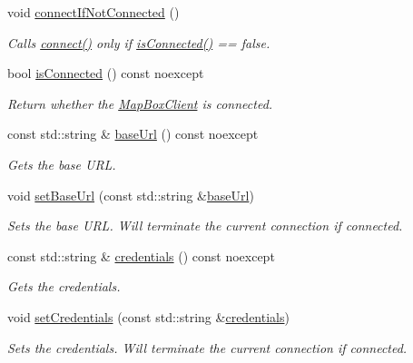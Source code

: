 \begin{DoxyCompactItemize}
void \hyperlink{group___imagery_module_gafbcd14e6930fee4427877f52e36613ba}{connect\+If\+Not\+Connected} ()
\begin{DoxyCompactList}\small\item\em Calls \hyperlink{group___imagery_module_ga5e5f58c725cafba7966936f688a6ade0}{connect()} only if \hyperlink{group___imagery_module_gab0c42dc6fd8965108c0bc5ef80d4d4b3}{is\+Connected()} == false. \end{DoxyCompactList}\item 
bool \hyperlink{group___imagery_module_gab0c42dc6fd8965108c0bc5ef80d4d4b3}{is\+Connected} () const noexcept
\begin{DoxyCompactList}\small\item\em Return whether the \hyperlink{classdg_1_1deepcore_1_1imagery_1_1_map_box_client}{Map\+Box\+Client} is connected. \end{DoxyCompactList}\item 
const std\+::string \& \hyperlink{group___imagery_module_gadf279770cec6dc9ac56348bb2e1b29e1}{base\+Url} () const noexcept
\begin{DoxyCompactList}\small\item\em Gets the base U\+RL. \end{DoxyCompactList}\item 
void \hyperlink{group___imagery_module_ga39b179cd4494f868a7807f616e04ee24}{set\+Base\+Url} (const std\+::string \&\hyperlink{group___imagery_module_gadf279770cec6dc9ac56348bb2e1b29e1}{base\+Url})
\begin{DoxyCompactList}\small\item\em Sets the base U\+RL. Will terminate the current connection if connected. \end{DoxyCompactList}\item 
const std\+::string \& \hyperlink{group___imagery_module_gac4c03ea635c336ca2fe7de533706c11c}{credentials} () const noexcept
\begin{DoxyCompactList}\small\item\em Gets the credentials. \end{DoxyCompactList}\item 
void \hyperlink{group___imagery_module_ga28ed4b8b833fa7785b0c456f79df0c40}{set\+Credentials} (const std\+::string \&\hyperlink{group___imagery_module_gac4c03ea635c336ca2fe7de533706c11c}{credentials})
\begin{DoxyCompactList}\small\item\em Sets the credentials. Will terminate the current connection if connected. \end{DoxyCompactList}\item 

\end{DoxyCompactItemize}

